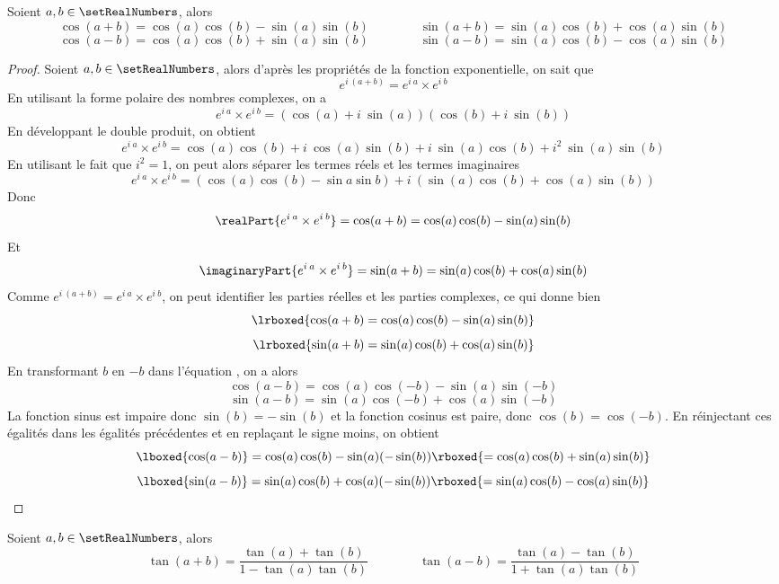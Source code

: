 \begin{theorem}
\label{trigonometrie:addition:sinus_et_cosinus}
Soient $a, b \in \setRealNumbers$, alors
\[
\cos(a+b) = \cos(a)\cos(b) - \sin(a)\sin(b) 
\qquad\qquad
\sin(a+b) = \sin(a)\cos(b) + \cos(a)\sin(b)
\]
\[
\cos(a-b) = \cos(a)\cos(b) + \sin(a)\sin(b)
\qquad\qquad
\sin(a-b) = \sin(a)\cos(b) - \cos(a)\sin(b)
\]
\end{theorem}

\begin{proof}
Soient $a, b \in \setRealNumbers$, alors d'après les propriétés de la fonction exponentielle, on sait que 
\[
e^{i\:(a+b)} =e^{i\:a}\times e^{i\:b}
\]
En utilisant la forme polaire des nombres complexes, on a
\[
e^{i\:a}\times e^{i\:b} 
= \left(\cos(a)+i\:\sin(a)\right)\left(\cos(b)+i\:\sin(b)\right)
\]
En développant le double produit, on obtient
\[
e^{i\:a}\times e^{i\:b}
=  \cos(a)\cos(b) +i\:\cos(a)\sin(b)+i\:\sin(a)\cos(b)+i^2\:\sin(a)\sin(b)
\]
En utilisant le fait que $i^2 = 1$, on peut alors séparer les termes réels et les termes imaginaires
\[
e^{i\:a}\times e^{i\:b} = \left(\cos(a)\cos(b)-\sin{a}\sin{b}\right)+i\:\left(\sin(a)\cos(b) +\cos(a)\sin(b)\right)
\]
Donc
\[\realPart{e^{i\:a}\times e^{i\:b}} = \cos(a+b) = \cos(a)\cos(b) - \sin(a)\sin(b)
\]
Et
\[
\imaginaryPart{e^{i\:a}\times e^{i\:b}} = \sin(a+b) = \sin(a)\cos(b) + \cos(a)\sin(b)
\]
Comme $e^{i\:(a+b)} = e^{i\:a}\times e^{i\:b}$, on peut identifier les parties réelles et les parties complexes, ce qui donne bien
\[
\lrboxed{\cos(a+b) = \cos(a)\cos(b) - \sin(a)\sin(b)}
\]
\[
\lrboxed{\sin(a+b) = \sin(a)\cos(b) + \cos(a)\sin(b)}
\]
En transformant $b$ en $-b$ dans l'équation , on a alors 
\[
\cos(a-b) = \cos(a)\cos(-b) - \sin(a)\sin(-b)
\]
\[
\sin(a-b) = \sin(a)\cos(-b) + \cos(a)\sin(-b)
\]
La fonction sinus est impaire donc $\sin(b)= -\sin(b)$ et la fonction cosinus est paire, donc $\cos(b)=\cos(-b)$. En réinjectant ces égalités dans les égalités précédentes et en replaçant le signe moins, on obtient
\[
\lboxed{\cos(a-b)} = \cos(a)\cos(b) - \sin(a)(-\sin(b)) \rboxed{= \cos(a)\cos(b) + \sin(a)\sin(b)}
\]
\[
\lboxed{\sin(a-b)} = \sin(a)\cos(b) + \cos(a)(-\sin(b)) \rboxed{=  \sin(a)\cos(b) - \cos(a)\sin(b)}
\]
\end{proof}

\begin{theorem}
\label{trigonometrie:addition:tangente}
Soient $a, b \in \setRealNumbers$, alors
\[
\tan(a+b) = \dfrac{\tan(a)+\tan(b)}{1 - \tan(a)\tan(b)}
\qquad\qquad
\tan(a-b) = \dfrac{\tan(a)-\tan(b)}{1 + \tan(a)\tan(b)}
\]
\end{theorem}

